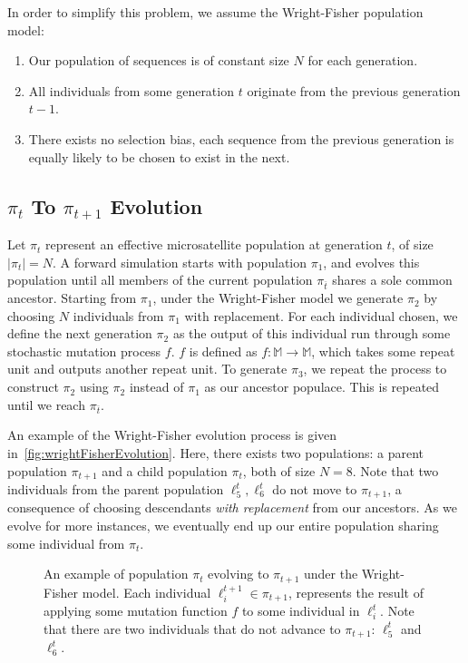 In order to simplify this problem, we assume the Wright-Fisher population model:
\begin{enumerate}
    \item Our population of sequences is of constant size $N$ for each generation.
    \item All individuals from some generation $t$ originate from the previous generation $t - 1$.
    \item There exists no selection bias, each sequence from the previous generation is equally likely to be
        chosen to exist in the next.
\end{enumerate}

\subsection{$\pi_t$ To $\pi_{t+1}$ Evolution}\label{subsec:piTopiEvolution}
Let $\pi_t$ represent an effective microsatellite population at generation $t$, of size $\left|\pi_t \right| = N$.
A forward simulation starts with population $\pi_1$, and evolves this population until all members of the current
population $\pi_{\overbar{t}}$ shares a sole common ancestor.
Starting from $\pi_1$, under the Wright-Fisher model we generate $\pi_2$ by choosing $N$ individuals from $\pi_1$ with
replacement.
For each individual chosen, we define the next generation $\pi_2$ as the output of this individual run through some
stochastic mutation process $f$.
$f$ is defined as $f : \mathbb{M} \rightarrow \mathbb{M}$, which takes some repeat unit and outputs another
repeat unit.
To generate $\pi_3$, we repeat the process to construct $\pi_2$ using $\pi_2$ instead of $\pi_1$ as our ancestor
populace.
This is repeated until we reach $\pi_{\overbar{t}}$.

An example of the Wright-Fisher evolution process is given in~\autoref{fig:wrightFisherEvolution}.
Here, there exists two populations: a parent population $\pi_{t+1}$ and a child population $\pi_t$, both of size $N=8$.
Note that two individuals from the parent population $\ell_5^t, \ell_6^t$ do not move to $\pi_{t+1}$, a consequence of
choosing descendants \emph{with replacement} from our ancestors.
As we evolve for more instances, we eventually end up our entire population sharing some individual from $\pi_t$.

\begin{figure}[t]
    \centering{}
    \caption{An example of population $\pi_{t}$ evolving to $\pi_{t+1}$ under the Wright-Fisher model.
    Each individual $\ell^{t+1}_i \in \pi_{t+1}$, represents the result of applying some mutation function $f$ to
    some individual in $\ell^t_i$.
    Note that there are two individuals that do not advance to $\pi_{t+1}$: $\ell^t_5$ and $\ell^t_6$.}
    \label{fig:wrightFisherEvolution}
\end{figure}

